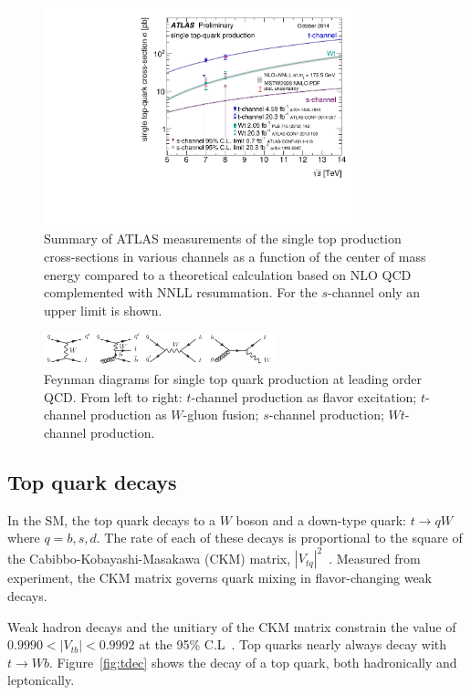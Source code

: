 \begin{figure}[h]
\centering
\includegraphics[width=0.8\textwidth]{fig/thry/singletop_allchanvsroots_ATLASonly.pdf}
\caption{Summary of ATLAS measurements of the single top production cross-sections in various channels as a function of the center of mass energy compared to a theoretical calculation based on NLO QCD complemented with NNLL resummation. For the $s$-channel only an upper limit is shown.}
\label{fig:txsec}
\end{figure}
\begin{figure}[h]
\centering
\includegraphics[width=0.6\textwidth]{fig/thry/fig_singletop.png}
\caption{Feynman diagrams for single top quark production at leading order QCD. From left to right: $t$-channel production as flavor excitation; $t$-channel production as $W$-gluon fusion; $s$-channel production; $Wt$-channel production.}
\label{fig:tdiag}
\end{figure}

\subsection{Top quark decays}
In the SM, the top quark decays to a $W$ boson and a down-type quark: $t \rightarrow qW$ where $q=b,s,d$. The rate of each of these decays is proportional to the square of the Cabibbo-Kobayashi-Masakawa (CKM) matrix, $|V_{tq}|^2$~\cite{PDG}. Measured from experiment, the CKM matrix governs quark mixing in flavor-changing weak decays.



Weak hadron decays and the unitiary of the CKM matrix constrain the value of $0.9990 < |V_{tb}| < 0.9992$ at the 95\% C.L~\cite{Chetyrkin:1999ys}. Top quarks nearly always decay with $t \rightarrow Wb$. Figure~\ref{fig:tdec} shows the decay of a top quark, both hadronically and leptonically.

